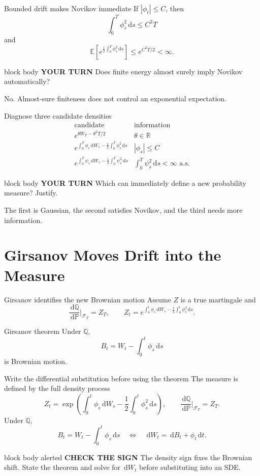 \documentclass[handout,10pt,aspectratio=169]{beamer}
\newenvironment{simplificationbox}{\begin{beamercolorbox}[rounded=true,sep=0.7em,wd=\textwidth]{block body alerted}
  \textbf{\color{CourseRed}CHECK THE SIGN}\quad}{\end{beamercolorbox}}
\newenvironment{pausebox}{\begin{beamercolorbox}[rounded=true,sep=0.8em,wd=\textwidth]{block body}
  \textbf{\color{CourseGold}YOUR TURN}\quad}{\end{beamercolorbox}}
\newcommand{\dd}{\,\mathrm d}
\newcommand{\E}{\mathbb E}
\newcommand{\Pp}{\mathbb P}
\newcommand{\Q}{\mathbb Q}
\newcommand{\R}{\mathbb R}
\newcommand{\cF}{\mathcal F}
\newcommand{\1}{\mathbf 1}
\begin{document}
\begin{frame}{Bounded drift makes Novikov immediate}
If \(|\phi_t|\le C\), then
\[
\int_0^T\phi_s^2\dd s\le C^2T
\]
and
\[
\E\!\left[e^{\frac12\int_0^T\phi_s^2\dd s}\right]
\le e^{C^2T/2}<\infty.
\]
\begin{pausebox}
Does finite energy almost surely imply Novikov automatically?
\end{pausebox}

No. Almost-sure finiteness does not control an exponential expectation.
\end{frame}

\begin{frame}{Diagnose three candidate densities}
\small
\[
\begin{array}{c|c}
\text{candidate} & \text{information}\\ \hline
e^{\theta W_T-\theta^2T/2} & \theta\in\R\\
e^{\int_0^T\phi_s\dd W_s-\frac12\int_0^T\phi_s^2\dd s}
& |\phi_s|\le C\\
e^{\int_0^T\psi_s\dd W_s-\frac12\int_0^T\psi_s^2\dd s}
& \int_0^T\psi_s^2\dd s<\infty\text{ a.s.}
\end{array}
\]
\begin{pausebox}
Which can immediately define a new probability measure? Justify.
\end{pausebox}

The first is Gaussian, the second satisfies Novikov, and the third needs
more information.
\end{frame}

\section{Girsanov Moves Drift into the Measure}

\begin{frame}{Girsanov identifies the new Brownian motion}
Assume \(Z\) is a true martingale and
\[
\frac{\dd\Q}{\dd\Pp}\bigg|_{\cF_T}=Z_T,
\qquad
Z_t=e^{\int_0^t\phi_s\dd W_s-\frac12\int_0^t\phi_s^2\dd s}.
\]
\begin{block}{Girsanov theorem}
Under \(\Q\),
\[
\boxed{B_t=W_t-\int_0^t\phi_s\dd s}
\]
is Brownian motion.
\end{block}
\end{frame}

\begin{frame}{Write the differential substitution before using the theorem}
The measure is defined by the full density process
\[
Z_t=\exp\!\left(\int_0^t\phi_s\dd W_s
-\frac12\int_0^t\phi_s^2\dd s\right),
\qquad \frac{\dd\Q}{\dd\Pp}\bigg|_{\cF_T}=Z_T.
\]
Under \(\Q\),
\[
B_t=W_t-\int_0^t\phi_s\dd s
\quad\Longleftrightarrow\quad
\boxed{\dd W_t=\dd B_t+\phi_t\dd t.}
\]
\begin{simplificationbox}
The density sign fixes the Brownian shift. State the theorem and solve for
\(\dd W_t\) before substituting into an SDE.
\end{simplificationbox}
\end{frame}
\end{document}
